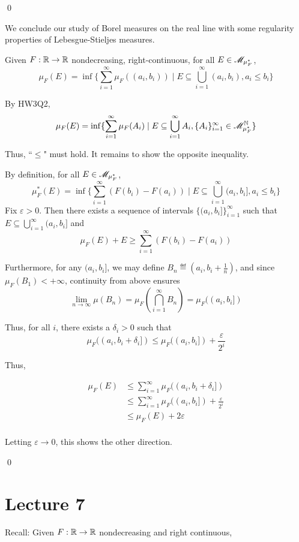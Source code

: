 \documentclass[x11names,reqno,14pt]{extarticle}
\newcommand*{\oo}{\infty}
\newcommand{\seq}[1]{_{#1 = 1}^\oo}
\begin{document}
\qed

We conclude our study of Borel measures on the real line with some regularity properties of Lebesgue-Stieljes measures. 

\lem

Given $F:\mathbb{R}\to\mathbb{R}$ nondecreasing, right-continuous, for all $E \in \mathscr{M}_{\mu^*_F}$, 
\[
\mu_F(E) = \inf\{\sum\seq{i}\mu_F((a_i, b_i)) \mid E\subseteq\bigcup\seq{i}(a_i, b_i), a_i \leq b_i \}
\]

\proof

By HW3Q2, 
\[
\mu_F(E) = \inf\{\sum\seq{i}\mu_F(A_i) \mid E \subseteq\bigcup\seq{i} A_i, \{A_i\}\seq{i} \in \ms{M}_{\mu^*_F}^\N\}
\]

Thus, ``$\leq$" must hold. It remains to show the opposite inequality. 

By definition, for all $E \in \mathscr{M}_{\mu^*_F}$, 
\[
\mu^*_F(E) = \inf\{\sum\seq{i}(F(b_i) - F(a_i)) \mid E \subseteq \bigcup\seq{i}(a_i, b_i], a_i \leq b_i\}
\]
Fix $\varepsilon>0$. Then there exists a sequence of intervals $\{(a_i, b_i]\}\seq{i}$ such that $E\subseteq\bigcup\seq{i}(a_i, b_i]$ and 
\[
\mu_F(E) + E \geq \sum\seq{i}(F(b_i) - F(a_i)) 
\]

Furthermore, for any $(a_i, b_i]$, we may define $B_n\eqdef (a_i, b_i + \frac{1}{n})$, and since $\mu_F(B_1)<+\oo$, continuity from above ensures
\[
\lim_{n\to\oo}\mu(B_n)=\mu_F\left(\bigcap\seq{i}B_n\right) = \mu_F((a_i, b_i])
\]

Thus, for all $i$, there exists a $\delta_i>0$ such that 
\[
\mu_F((a_i, b_i + \delta_i]) \leq \mu_F((a_i, b_i]) + \frac{\varepsilon}{2^i}
\]

Thus, 

\begin{align*}
\mu_F(E) & \leq \sum\seq{i}\mu_F((a_i, b_i + \delta_i]) \\
			& \leq \sum\seq{i}\mu_F((a_i, b_i]) + \frac{\varepsilon}{2^i} \\
			& \leq \mu_F(E) + 2\varepsilon\\
\end{align*}

Letting $\varepsilon\to0$, this shows the other direction. 

\qed

\section*{Lecture 7}

Recall: Given $F:\mathbb{R}\to\mathbb{R}$ nondecreasing and right continuous, 
\end{document}
